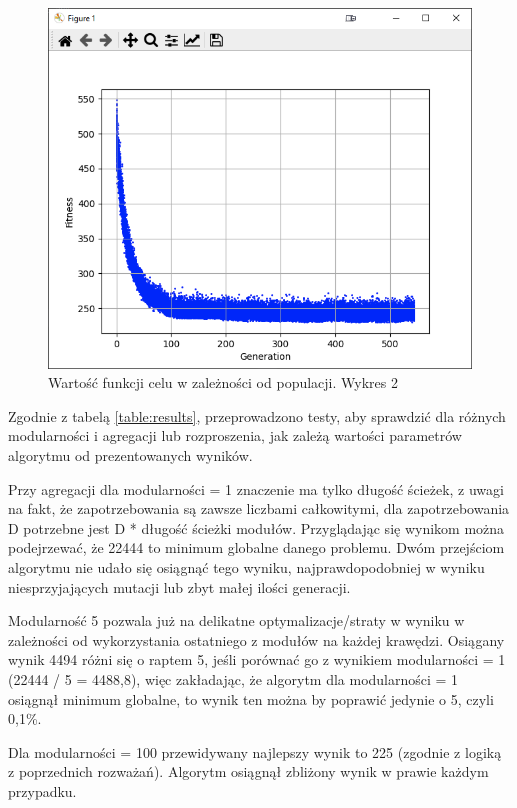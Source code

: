 \begin{figure}[h!]
    \centering
    \includegraphics[width=\textwidth]{img/wykres2.png}
    \caption{Wartość funkcji celu w zależności od populacji. Wykres 2}
    \label{fig:b}
\end{figure}

Zgodnie z tabelą \ref{table:results}, przeprowadzono testy, aby sprawdzić dla różnych modularności  i agregacji lub rozproszenia, jak zależą wartości parametrów algorytmu od prezentowanych wyników. 

Przy agregacji dla modularności = 1 znaczenie ma tylko długość ścieżek, z uwagi na fakt, że zapotrzebowania są zawsze liczbami całkowitymi, dla zapotrzebowania D potrzebne jest D * długość ścieżki modułów. Przyglądając się wynikom można podejrzewać, że 22444 to minimum globalne danego problemu. Dwóm przejściom algorytmu nie udało się osiągnąć tego wyniku, najprawdopodobniej w wyniku niesprzyjających mutacji lub zbyt małej ilości generacji.

Modularność 5 pozwala już na delikatne optymalizacje/straty w wyniku w zależności od wykorzystania ostatniego z modułów na każdej krawędzi. Osiągany wynik 4494 różni się o raptem 5, jeśli porównać go z wynikiem modularności = 1 (22444 / 5 = 4488,8), więc zakładając, że algorytm dla modularności = 1 osiągnął minimum globalne, to wynik ten można by poprawić jedynie o 5, czyli 0,1\%.

Dla modularności = 100 przewidywany najlepszy wynik to 225 (zgodnie z logiką z poprzednich rozważań). Algorytm osiągnął zbliżony wynik w prawie każdym przypadku. 

